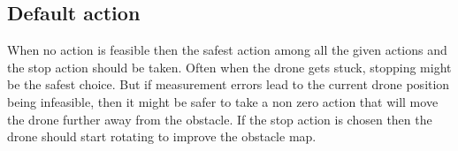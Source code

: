 \subsection{Default action}

When no action is feasible then the safest action among all the given actions and the stop action should be taken. Often when the drone gets stuck, stopping might be the safest choice. But if measurement errors lead to the current drone position being infeasible, then it might be safer to take a non zero action that will move the drone further away from the obstacle. If the stop action is chosen then the drone should start rotating to improve the obstacle map.



